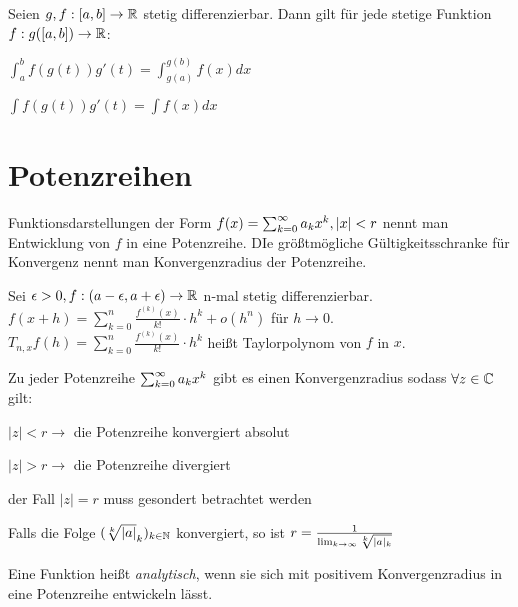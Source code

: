 \documentclass[]{article}
\begin{document}
\begin{satz}
	Seien $g,f : [a,b] \rightarrow \mathbb{R}$ stetig differenzierbar. Dann gilt für jede stetige Funktion $f : g([a,b]) \rightarrow \mathbb{R}$:
	\begin{description}[noitemsep]
		\item $\int_{a}^{b} f(g(t))g'(t) = \int_{g(a)}^{g(b)}f(x)dx$
		\item $\int f(g(t))g'(t) = \int f(x)dx$
	\end{description}
\end{satz}


\section{Potenzreihen}

\begin{definition}
	Funktionsdarstellungen der Form $f(x) = \sum_{k = 0}^{\infty} a_{k}x^k, |x| < r$ nennt man Entwicklung von $f$ in eine Potenzreihe. DIe größtmögliche Gültigkeitsschranke für Konvergenz nennt man Konvergenzradius der Potenzreihe.
\end{definition}

\begin{satz}
	Sei $\epsilon > 0, f : (a-\epsilon, a +\epsilon) \rightarrow \mathbb{R}$ n-mal stetig differenzierbar. $f(x+h) = \sum_{k = 0}^n \frac{f^{(k)}(x)}{k!} \cdot h^k + o(h^n)$ für $h \rightarrow 0$. $T_{n,x}f(h) = \sum_{k = 0}^n \frac{f^{(k)}(x)}{k!} \cdot h^k$ heißt Taylorpolynom von $f$ in $x$.
\end{satz}

\begin{satz}
	Zu jeder Potenzreihe $\sum_{k = 0}^{\infty} a_{k}x^k$ gibt es einen Konvergenzradius sodass $\forall z \in \mathbb{C}$ gilt:
	\begin{description}[noitemsep]
		\item $|z| < r \rightarrow $ die Potenzreihe konvergiert absolut
		\item $|z| > r \rightarrow $ die Potenzreihe divergiert
		\item der Fall $|z| = r$ muss gesondert betrachtet werden
	\end{description}
	Falls die Folge $(\sqrt[k]{|a|}_{k})_{k \in \mathbb{N}}$ konvergiert, so ist $r = \frac{1}{\lim_{k \rightarrow \infty}\sqrt[k]{|a|_k}}$
\end{satz}

\begin{definition}
	Eine Funktion heißt \emph{analytisch}, wenn sie sich mit positivem Konvergenzradius in eine Potenzreihe entwickeln lässt.
\end{definition}
\end{document}
